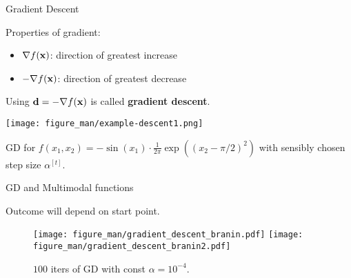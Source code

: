 \documentclass[11pt,compress,t,notes=noshow, xcolor=table]{beamer}
\begin{document}

\begin{vbframe}{Gradient Descent}

	Properties of gradient: 

	\begin{itemize}
		\item $\nabla f(\mathbf{x})$: direction of greatest increase
		\item $- \nabla f(\mathbf{x})$: direction of greatest decrease
	\end{itemize}

	\vspace*{0.3cm}

	Using $\mathbf{d} = - \nabla f(\mathbf{x})$ is called \textbf{gradient descent}. 

	\begin{center}
		\texttt{[image: figure\_man/example-descent1.png]} \\
		\begin{footnotesize}
			GD for $f(x_1, x_2) = - \sin(x_1) \cdot \frac{1}{2\pi} \exp\left( (x_2 - \pi / 2)^2 \right)$ with sensibly chosen step size $\alpha^{[t]}$. 
		\end{footnotesize}
	\end{center}


\end{vbframe}

\begin{vbframe}{GD and Multimodal functions}

Outcome will depend on start point.

\vspace{0.5\baselineskip}

\begin{figure}
	\texttt{[image: figure\_man/gradient\_descent\_branin.pdf]} \texttt{[image: figure\_man/gradient\_descent\_branin2.pdf]}\\
	\vspace*{-0.3cm}
	\begin{footnotesize}
		$100$ iters of GD with const $\alpha = 10^{-4}$.
	\end{footnotesize}
\end{figure}

\end{vbframe}

\end{document}
